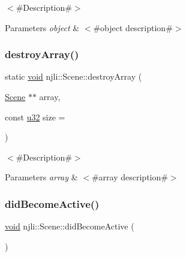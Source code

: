 $<$\#\+Description\#$>$


\begin{DoxyParams}{Parameters}
{\em object} & $<$\#object description\#$>$ \\
\hline
\end{DoxyParams}
\mbox{\label{classnjli_1_1_scene_a0214dc61cbd3b427fc1642c5f7288c16}} 
\subsubsection{\texorpdfstring{destroy\+Array()}{destroyArray()}}
{\footnotesize\ttfamily static \mbox{\hyperlink{_thread_8h_af1e856da2e658414cb2456cb6f7ebc66}{void}} njli\+::\+Scene\+::destroy\+Array (\begin{DoxyParamCaption}\item[{\mbox{\hyperlink{classnjli_1_1_scene}{Scene}} $\ast$$\ast$}]{array,  }\item[{const \mbox{\hyperlink{_util_8h_a10e94b422ef0c20dcdec20d31a1f5049}{u32}}}]{size = {} }\end{DoxyParamCaption})\hspace{0.3cm}{\ttfamily [static]}}

$<$\#\+Description\#$>$


\begin{DoxyParams}{Parameters}
{\em array} & $<$\#array description\#$>$ \\
\hline
\end{DoxyParams}
\mbox{\label{classnjli_1_1_scene_a1cdee932514ef030b48aba4aa23f899f}} 
\subsubsection{\texorpdfstring{did\+Become\+Active()}{didBecomeActive()}}
{\footnotesize\ttfamily \mbox{\hyperlink{_thread_8h_af1e856da2e658414cb2456cb6f7ebc66}{void}} njli\+::\+Scene\+::did\+Become\+Active (\begin{DoxyParamCaption}{ }\end{DoxyParamCaption})}

\mbox{\label{classnjli_1_1_scene_abea5b18900978c635d8504ca14436e79}} 
